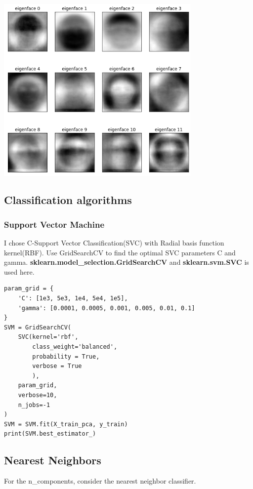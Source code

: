 \documentclass{article}
\begin{document}
\begin{center}
  \includegraphics[width=10cm]{eigenfaces.png}
\end{center}

\subsection{Classification algorithms}


\subsubsection{Support Vector Machine}
I chose C-Support Vector Classification(SVC) with Radial basis function kernel(RBF). Use GridSearchCV to find the optimal SVC parameters C and gamma.
\textbf{sklearn.model\_selection.GridSearchCV} and \textbf{sklearn.svm.SVC} is used here.
\begin{lstlisting}
param_grid = {
    'C': [1e3, 5e3, 1e4, 5e4, 1e5],
    'gamma': [0.0001, 0.0005, 0.001, 0.005, 0.01, 0.1]
}
SVM = GridSearchCV(
    SVC(kernel='rbf',
        class_weight='balanced',
        probability = True,
        verbose = True
        ),
    param_grid,
    verbose=10,
    n_jobs=-1
)
SVM = SVM.fit(X_train_pca, y_train)
print(SVM.best_estimator_)
\end{lstlisting}

\subsection{Nearest Neighbors}
For the n\_components, consider the nearest neighbor classifier.
\end{document}
